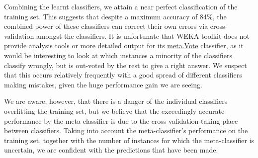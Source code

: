 \documentclass[12pt]{article}
\begin{document}
Combining the learnt classifiers, we attain a near perfect classification of the training set. This suggests that despite a maximum accuracy of 84\%, the combined power of these classifiers can correct their own errors via cross-validation amongst the classifiers. It is unfortunate that WEKA toolkit does not provide analysis tools or more detailed output for its \url{meta.Vote} classifier, as it would be interesting to look at which instances a minority of the classifiers classify wrongly, but is out-voted by the rest to give a right answer. We suspect that this occurs relatively frequently with a good spread of different classifiers making mistakes, given the huge performance gain we are seeing.

We are aware, however, that there is a danger of the individual classifiers overfitting the training set, but we believe that the exceedingly accurate performance by the meta-classifier is due to the cross-validation taking place between classifiers. Taking into account the meta-classifier's performance on the training set, together with the number of instances for which the meta-classifier is uncertain, we are confident with the predictions that have been made.
\end{document}
